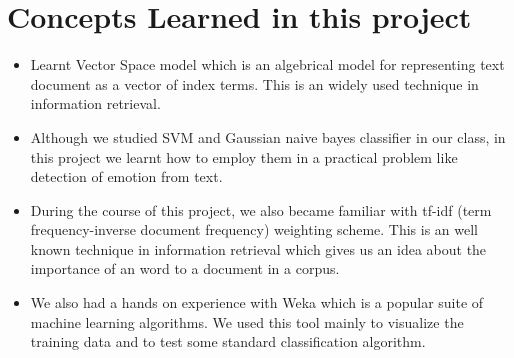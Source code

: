 \section{Concepts Learned in this project}
\begin{itemize}
    \item Learnt Vector Space model which is an algebrical model for representing
        text document as a vector of index terms. This is an widely used
        technique in information retrieval.
    \item Although we studied SVM and Gaussian naive bayes classifier in our
        class, in this project we learnt how to employ them in a practical
        problem like detection of emotion from text.
    \item During the course of this project, we also became familiar with
        tf-idf (term frequency-inverse document frequency) weighting scheme.
        This is an well known technique in information retrieval which gives us
        an idea about the importance of an word to a document in a corpus.
    \item We also had a hands on experience with Weka which is a popular suite
        of machine learning algorithms. We used this tool mainly to visualize the
        training data and to test some standard classification algorithm.
\end{itemize}


